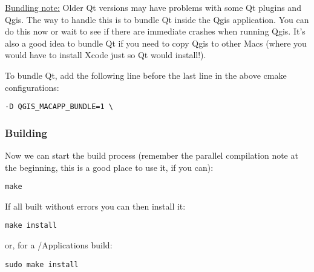 \underline{Bundling note:} Older Qt versions may have problems with some Qt plugins and Qgis.
The way to handle this is to bundle Qt inside the Qgis application.  You can do this now
or wait to see if there are immediate crashes when running Qgis.  It's also a good
idea to bundle Qt if you need to copy Qgis to other Macs (where you would have to
install Xcode just so Qt would install!).

To bundle Qt, add the following line before the last line in the above cmake configurations:

\begin{verbatim}
-D QGIS_MACAPP_BUNDLE=1 \
\end{verbatim}

\hypertarget{toc25}{}
\subsubsection{Building}
Now we can start the build process (remember the parallel compilation note at
the beginning, this is a good place to use it, if you can):

\begin{verbatim}
make 
\end{verbatim}

If all built without errors you can then install it:

\begin{verbatim}
make install 
\end{verbatim}

or, for a /Applications build:

\begin{verbatim}
sudo make install
\end{verbatim}


